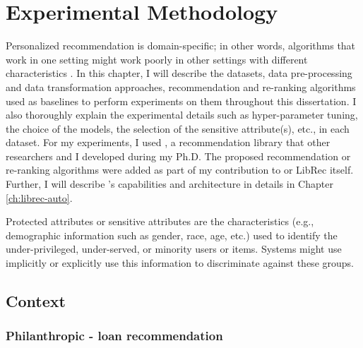\chapter{Experimental Methodology}
\label{ch:methodology}

Personalized recommendation is domain-specific; in other words, algorithms that work in one setting might work poorly in other settings with different characteristics \cite{Beel2016Reproducibility,}.
In this chapter, I will describe the datasets, data pre-processing and data transformation approaches, recommendation and re-ranking algorithms used as baselines to perform experiments on them throughout this dissertation.
I also thoroughly explain the experimental details such as hyper-parameter tuning, the choice of the models, the selection of the sensitive attribute(s), etc., in each dataset. For my experiments, I used \libauto{}, a recommendation library that other researchers and I developed during my Ph.D. The proposed recommendation or re-ranking algorithms were added as part of my contribution to \libauto{} or LibRec itself. Further, I will describe \libauto{}'s capabilities and architecture in details in Chapter \ref{ch:librec-auto}.

Protected attributes or sensitive attributes are the characteristics (e.g., demographic information such as gender, race, age, etc.) used to identify the under-privileged, under-served, or minority users or items. Systems might use implicitly or explicitly use this information to discriminate against these groups.

\section{Context}
    \subsection{Philanthropic - loan recommendation}

